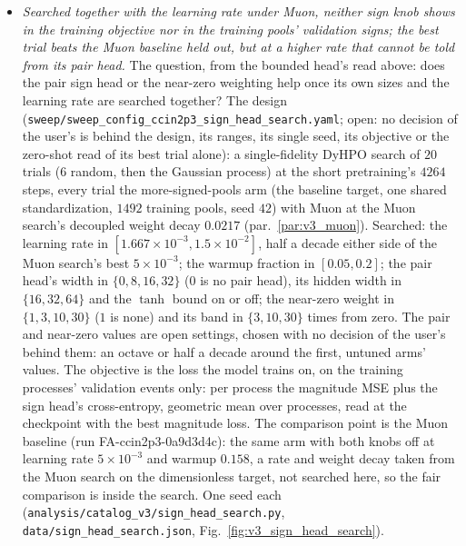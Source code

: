 \documentclass[11pt]{article}
\newcommand{\code}[1]{\texttt{#1}}
\begin{document}
\begin{itemize}
  \item \emph{Searched together with the learning rate under Muon, neither sign knob shows in the training objective nor
    in the training pools' validation signs; the best trial beats the Muon baseline held out, but at a higher rate that
    cannot be told from its pair head.} The question, from the bounded head's read above: does the pair sign head or the near-zero
    weighting help once its own sizes and the learning rate are searched together? The design
    (\code{sweep/sweep\_config\_ccin2p3\_sign\_head\_search.yaml}; open: no decision of the user's is behind the
    design, its ranges, its single seed, its objective or the zero-shot read of its best trial alone): a single-fidelity
    DyHPO search of $20$ trials ($6$ random, then the Gaussian process) at the short pretraining's $4264$ steps, every
    trial the more-signed-pools arm (the baseline target, one shared standardization, $1492$ training pools, seed $42$)
    with Muon at the Muon search's decoupled weight decay $0.0217$ (par.~\ref{par:v3_muon}). Searched: the learning
    rate in $[1.667\times10^{-3}, 1.5\times10^{-2}]$, half a decade either side of the Muon search's best $5\times10^{-3}$;
    the warmup fraction in $[0.05, 0.2]$; the pair head's width in $\{0, 8, 16, 32\}$ ($0$ is no pair head), its hidden
    width in $\{16, 32, 64\}$ and the $\tanh$ bound on or off; the near-zero weight in $\{1, 3, 10, 30\}$ ($1$ is none)
    and its band in $\{3, 10, 30\}$ times from zero. The pair and near-zero values are open settings, chosen with no
    decision of the user's behind them: an octave or half a decade around the first, untuned arms' values. The
    objective is the loss the model trains on, on the training processes' validation events only: per process the
    magnitude MSE plus the sign head's cross-entropy, geometric mean over processes, read at the checkpoint with the
    best magnitude loss. The comparison point is the Muon baseline (run FA-ccin2p3-0a9d3d4c): the same arm with both
    knobs off at learning rate $5\times10^{-3}$ and warmup $0.158$, a rate and weight decay taken from the Muon search
    on the dimensionless target, not searched here, so the fair comparison is inside the search. One seed each
    (\code{analysis/catalog\_v3/sign\_head\_search.py}, \code{data/sign\_head\_search.json},
    Fig.~\ref{fig:v3_sign_head_search}).

\end{itemize}
\end{document}
